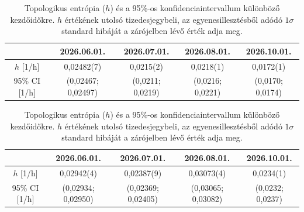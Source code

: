 \documentclass[12pt,a4paper]{article}
\begin{document}
\begin{table}[H]
    \centering
    \begin{subtable}{\textwidth}
        \centering
        \begin{tabular}{|c|c|c|c|c|}\hline
            & \textbf{2026.06.01.} & \textbf{2026.07.01.} & \textbf{2026.08.01.} & \textbf{2026.10.01.} \\\hline
            $h$ [1/h] & 0,02482(7) & 0,0215(2) & 0,0218(1) & 0,0172(1) \\\hline
            95\% CI [1/h] & (0,02467; 0,02497) & (0,0211; 0,0219) & (0,0216; 0,0221) & (0,0170; 0,0174) \\\hline
        \end{tabular}
        \caption{AIFS}
    \end{subtable}

    \vspace{0.6cm}

    \begin{subtable}{\textwidth}
        \centering
        \begin{tabular}{|c|c|c|c|c|}\hline
            & \textbf{2026.06.01.} & \textbf{2026.07.01.} & \textbf{2026.08.01.} & \textbf{2026.10.01.} \\\hline
            $h$ [1/h] & 0,02942(4) & 0,02387(9) & 0,03073(4) & 0,0234(1) \\\hline
            95\% CI [1/h] & (0,02934; 0,02950) & (0,02369; 0,02405) & (0,03065; 0,03082) & (0,0232; 0,0237) \\\hline
        \end{tabular}
        \caption{IFS}
    \end{subtable}
    \caption{Topologikus entrópia ($h$) és a 95\%-os konfidenciaintervallum különböző kezdőidőkre. $h$ értékének utolsó tizedesjegybeli, az egyenesillesztésből adódó $1 \sigma$ standard hibáját a zárójelben lévő érték adja meg.}
    \label{tab:jet500_top}
\end{table}
\end{document}
